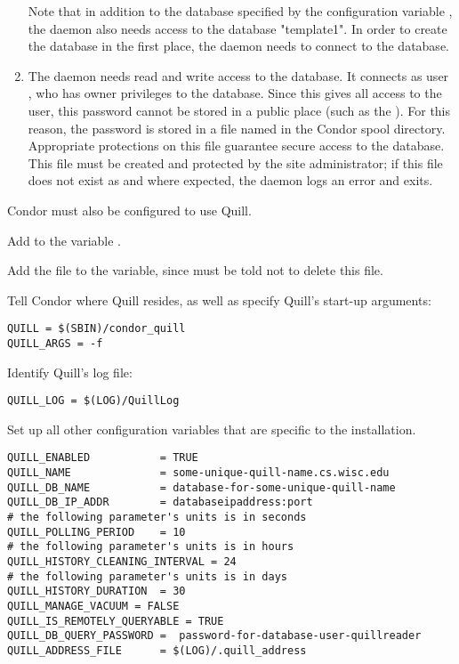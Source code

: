 \begin{enumerate}
Note that in addition to the database specified by
the configuration variable ,
the  daemon also needs access to the database
"template1".
In order to create the database in the first place, 
the  daemon needs to connect to the database.

\item The  daemon needs read and write access
to the database.
It connects as user ,
who has owner privileges to the database.
Since this gives all access to the  user,
this password cannot be stored in a public place 
(such as the ).
For this reason, the  password is stored
in a file named  in the Condor spool directory.
Appropriate protections on this file guarantee secure access to the database.
This file must be created and protected by the site administrator;
if this file does not exist as and where expected, the 
daemon logs an error and exits.

\end{enumerate}


Condor must also be configured to use Quill.

\begin{description}
\item Add  to the variable .
\item Add the file  to the 
   variable, since  must
  be told not to delete this file.
\item Tell Condor where Quill resides, as well as specify Quill's
  start-up arguments:
\begin{verbatim}
QUILL = $(SBIN)/condor_quill
QUILL_ARGS = -f
\end{verbatim}
\item Identify Quill's log file:
\begin{verbatim}
QUILL_LOG = $(LOG)/QuillLog
\end{verbatim}
\item Set up all other configuration variables that are specific
  to the installation.
\footnotesize
\begin{verbatim}
QUILL_ENABLED           = TRUE
QUILL_NAME              = some-unique-quill-name.cs.wisc.edu
QUILL_DB_NAME           = database-for-some-unique-quill-name
QUILL_DB_IP_ADDR        = databaseipaddress:port
# the following parameter's units is in seconds
QUILL_POLLING_PERIOD    = 10
# the following parameter's units is in hours
QUILL_HISTORY_CLEANING_INTERVAL = 24
# the following parameter's units is in days
QUILL_HISTORY_DURATION 	= 30
QUILL_MANAGE_VACUUM = FALSE
QUILL_IS_REMOTELY_QUERYABLE = TRUE
QUILL_DB_QUERY_PASSWORD =  password-for-database-user-quillreader
QUILL_ADDRESS_FILE      = $(LOG)/.quill_address
\end{verbatim}
\normalsize

\end{description}


